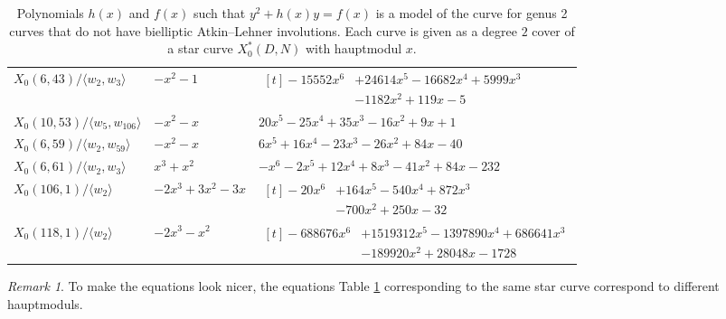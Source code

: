 \documentclass[12pt]{amsart}
\numberwithin{equation}{subsection}
\theoremstyle{plain}\newtheorem{ithm}{Theorem}
\theoremstyle{plain}\newtheorem{iprop}[ithm]{Proposition}
\theoremstyle{definition}
\theoremstyle{remark}
\newtheorem{remark}[equation]{Remark}
\newcommand{\Curve}[2]{X_0({#1},{#2})} %
\newcommand{\StarCurve}[2]{X_0^*({#1},{#2})} %
\begin{document}
\begin{table}
\begin{tabular}{lll}
\\

$\Curve{6}{43}/\langle w_2, w_3 \rangle$
&
$-x^2-1$& $\begin{aligned}[t]-15552x^6&+24614x^5-16682x^4+5999x^3\\
&-1182x^2+119x-5\end{aligned}$

\\

$\Curve{10}{53}/\langle w_5, w_{106} \rangle$
&
$-x^2-x$ &$20x^5-25x^4+35x^3-16x^2+9x+1$

\\

$\Curve{6}{59}/\langle w_2, w_{59} \rangle$
&
$-x^2-x$ &$6x^5+16x^4-23x^3-26x^2+84x-40$

\\

$\Curve{6}{61}/\langle w_2, w_3 \rangle$
&
$x^3+x^2$ &$ -x^6-2x^5+12x^4+8x^3-41x^2+84x-232$
\\

$\Curve{106}{1}/\langle w_2 \rangle$
&
$-2x^3+3x^2-3x$ & $\begin{aligned}[t]-20x^6&+164x^5-540x^4+872x^3\\
&-700x^2+250x-32\end{aligned}$

\\

$\Curve{118}{1}/\langle w_2 \rangle$
&
$-2x^3-x^2$ &$\begin{aligned}[t]-688676x^6&+1519312x^5-1397890x^4+686641x^3\\ &-189920x^2+28048x-1728\end{aligned}$

\\

\hline
\end{tabular}
\caption{Polynomials $h(x)$ and $f(x)$ such that $y^2 +h(x)y =f(x)$ is a model of the curve for genus 2 curves that do not have bielliptic Atkin--Lehner involutions. Each curve is given as a degree $2$ cover of a star curve $\StarCurve{D}{N}$ with hauptmodul $x$.} 
\label{modelsgen2}
\end{table}

\begin{remark}
To make the equations look nicer, the equations  Table \ref{modelsgen2} corresponding to the same star curve  correspond to  different hauptmoduls.
\end{remark}
\end{document}
